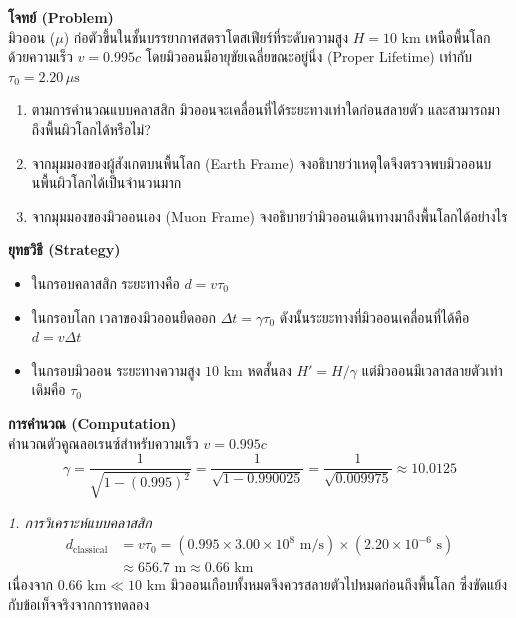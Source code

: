 \begin{psctexample}
\textbf{โจทย์ (Problem)} \\
มิวออน ($\mu$) ก่อตัวขึ้นในชั้นบรรยากาศสตราโตสเฟียร์ที่ระดับความสูง $H = 10\text{ km}$ เหนือพื้นโลก ด้วยความเร็ว $v = 0.995c$ โดยมิวออนมีอายุขัยเฉลี่ยขณะอยู่นิ่ง (Proper Lifetime) เท่ากับ $\tau_0 = 2.20\,\mu\text{s}$ 
\begin{enumerate}
    \item ตามการคำนวณแบบคลาสสิก มิวออนจะเคลื่อนที่ได้ระยะทางเท่าใดก่อนสลายตัว และสามารถมาถึงพื้นผิวโลกได้หรือไม่?
    \item จากมุมมองของผู้สังเกตบนพื้นโลก (Earth Frame) จงอธิบายว่าเหตุใดจึงตรวจพบมิวออนบนพื้นผิวโลกได้เป็นจำนวนมาก
    \item จากมุมมองของมิวออนเอง (Muon Frame) จงอธิบายว่ามิวออนเดินทางมาถึงพื้นโลกได้อย่างไร
\end{enumerate}

\textbf{ยุทธวิธี (Strategy)} \\
\begin{itemize}
    \item ในกรอบคลาสสิก ระยะทางคือ $d = v \tau_0$
    \item ในกรอบโลก เวลาของมิวออนยืดออก $\Delta t = \gamma \tau_0$ ดังนั้นระยะทางที่มิวออนเคลื่อนที่ได้คือ $d = v \Delta t$
    \item ในกรอบมิวออน ระยะทางความสูง $10\text{ km}$ หดสั้นลง $H' = H / \gamma$ แต่มิวออนมีเวลาสลายตัวเท่าเดิมคือ $\tau_0$
\end{itemize}

\textbf{การคำนวณ (Computation)} \\
คำนวณตัวคูณลอเรนซ์สำหรับความเร็ว $v = 0.995c$
\begin{equation}
\gamma = \frac{1}{\sqrt{1 - (0.995)^2}} = \frac{1}{\sqrt{1 - 0.990025}} = \frac{1}{\sqrt{0.009975}} \approx 10.0125
\end{equation}

\textit{1. การวิเคราะห์แบบคลาสสิก}
\begin{align}
d_{\text{classical}} &= v \tau_0 = (0.995 \times 3.00 \times 10^8\text{ m/s}) \times (2.20 \times 10^{-6}\text{ s}) \nonumber \\
&\approx 656.7\text{ m} \approx 0.66\text{ km}
\end{align}
เนื่องจาก $0.66\text{ km} \ll 10\text{ km}$ มิวออนเกือบทั้งหมดจึงควรสลายตัวไปหมดก่อนถึงพื้นโลก ซึ่งขัดแย้งกับข้อเท็จจริงจากการทดลอง


\end{psctexample}
